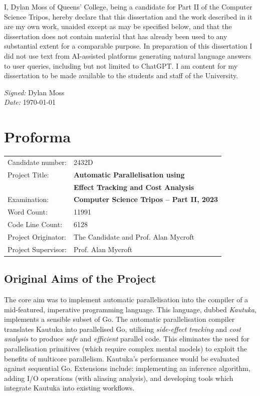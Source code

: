 \documentclass[12pt,a4paper,twoside,openright]{report}
\begin{document}
I, Dylan Moss of Queens' College, being a candidate for Part II of the Computer Science Tripos, hereby declare that this dissertation and the work described in it are my own work, unaided except as may be specified below, and that the dissertation does not contain material that has already been used to any substantial extent for a comparable purpose. In preparation of this dissertation I did not use text from AI-assisted platforms generating natural language answers to user queries, including but not limited to ChatGPT. I am content for my dissertation to be made available to the students and staff of the University.

\emph{Signed:} Dylan Moss\\
\emph{Date:} \today

\chapter*{Proforma}
 {\large
  \begin{tabular}{ll}
	  Candidate number:   & 2432D                                        \\
	  Project Title:      & \bf Automatic Parallelisation using          \\ & \bf Effect Tracking and Cost Analysis \\
	  Examination:        & \bf Computer Science Tripos -- Part II, 2023 \\
	  Word Count:         & 11991\footnotemark[1]                        \\
	  Code Line Count:    & 6128\footnotemark[2]                         \\
	  Project Originator: & The Candidate and Prof. Alan Mycroft         \\
	  Project Supervisor: & Prof. Alan Mycroft                           \\
  \end{tabular}
 }

\section*{Original Aims of the Project}
The core aim was to implement automatic parallelisation into the compiler of a mid-featured, imperative programming language. This language, dubbed \textit{Kautuka}, implements a sensible subset of Go. The automatic parallelisation compiler translates Kautuka into parallelised Go, utilising \textit{side-effect tracking} and \textit{cost analysis} to produce \textit{safe} and \textit{efficient} parallel code. This eliminates the need for parallelisation primitives (which require complex mental models) to exploit the benefits of multicore parallelism. Kautuka's performance would be evaluated against sequential Go. Extensions include: implementing an inference algorithm, adding I/O operations (with aliasing analysis), and developing tools which integrate Kautuka into existing workflows.
\end{document}
